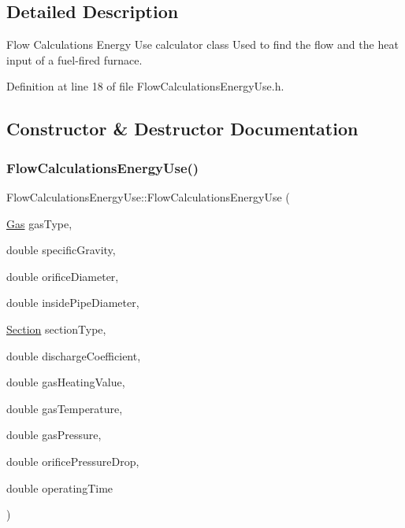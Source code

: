 \subsection{Detailed Description}
Flow Calculations Energy Use calculator class Used to find the flow and the heat input of a fuel-\/fired furnace. 

Definition at line 18 of file Flow\+Calculations\+Energy\+Use.\+h.



\subsection{Constructor \& Destructor Documentation}
\mbox{\label{class_flow_calculations_energy_use_a37514554d3cb04764b27d648966de471}} 
\subsubsection{\texorpdfstring{Flow\+Calculations\+Energy\+Use()}{FlowCalculationsEnergyUse()}\hspace{0.1cm}{\footnotesize\ttfamily [1/3]}}
{\footnotesize\ttfamily Flow\+Calculations\+Energy\+Use\+::\+Flow\+Calculations\+Energy\+Use (\begin{DoxyParamCaption}\item[{\hyperlink{class_flow_calculations_energy_use_a840d5a836e7b05d6791b79bace4440f2}{Gas}}]{gas\+Type,  }\item[{double}]{specific\+Gravity,  }\item[{double}]{orifice\+Diameter,  }\item[{double}]{inside\+Pipe\+Diameter,  }\item[{\hyperlink{class_flow_calculations_energy_use_afbabab0da698748de91369a5dfc7662a}{Section}}]{section\+Type,  }\item[{double}]{discharge\+Coefficient,  }\item[{double}]{gas\+Heating\+Value,  }\item[{double}]{gas\+Temperature,  }\item[{double}]{gas\+Pressure,  }\item[{double}]{orifice\+Pressure\+Drop,  }\item[{double}]{operating\+Time }\end{DoxyParamCaption})\hspace{0.3cm}{\ttfamily [inline]}}

